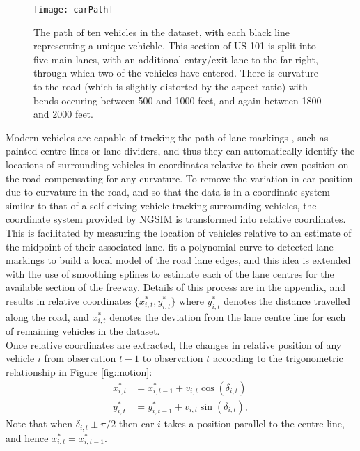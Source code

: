 \documentclass[12pt,a4paper]{article}\usepackage[]{graphicx}\usepackage[]{color}
\begin{document}
\begin{figure}
\centering
\texttt{[image: carPath]}
\caption{The path of ten vehicles in the dataset, with each black line representing a unique vehichle. This section of US 101 is split into five main lanes, with an additional entry/exit lane to the far right, through which two of the vehicles have entered. There is curvature to the road (which is slightly distorted by the aspect ratio) with bends occuring between 500 and 1000 feet, and again between 1800 and 2000 feet.}
\label{fig:rawData}
\end{figure}

Modern vehicles are capable of tracking the path of lane markings \citep{Thuy2010}, such as painted centre lines or lane dividers, and thus they can automatically identify the locations of surrounding vehicles in coordinates relative to their own position on the road compensating for any curvature. To remove the variation in car position due to curvature in the road, and so that the data is in a coordinate system similar to that of a self-driving vehicle tracking surrounding vehicles, the coordinate system provided by NGSIM is transformed into relative coordinates. This is facilitated by measuring the location of vehicles relative to an estimate of the midpoint of their associated lane. \citet{Woo2016a} fit a polynomial curve to detected lane markings to build a local model of the road lane edges, and this idea is extended with the use of smoothing splines to estimate each of the lane centres for the available section of the freeway. Details of this process are in the appendix, and results in relative coordinates $\{x^*_{i, t}, y^*_{i, t}\}$  where $y^*_{i, t}$ denotes the distance travelled along the road, and $x^*_{i, t}$ denotes the deviation from the lane centre line for each of remaining vehicles in the dataset.
\\

Once relative coordinates are extracted, the changes in relative position of any vehicle $i$ from observation $t-1$ to observation $t$ according to the trigonometric relationship in Figure \ref{fig:motion}:
\begin{align}
x^*_{i, t} &= x^*_{i, t-1} + v_{i, t} \cos(\delta_{i, t}) \label{xEq} \\
y^*_{i, t} &= y^*_{i, t-1} + v_{i, t} \sin(\delta_{i, t}) \label{yEq},
\end{align}
Note that when $\delta_{i, t} \pm \pi/2$ then car $i$ takes a position parallel to the centre line, and hence $x^*_{i, t} = x^*_{i, t-1}$.
\\
\end{document}
